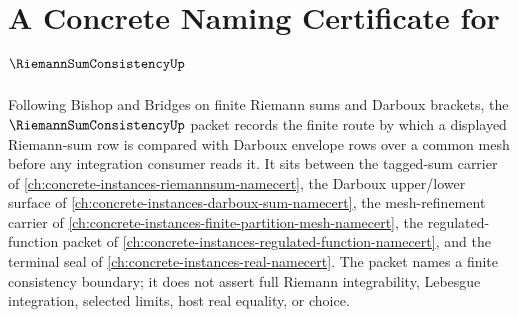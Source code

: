 \chapter{A Concrete Naming Certificate for $\RiemannSumConsistencyUp$}
\label{ch:concrete-instances-riemann-sum-consistency-namecert}

Following Bishop and Bridges on finite Riemann sums and Darboux brackets, the $\RiemannSumConsistencyUp$ packet records the finite route by which a displayed Riemann-sum row is compared with Darboux envelope rows over a common mesh before any integration consumer reads it. It sits between the tagged-sum carrier of \autoref{ch:concrete-instances-riemannsum-namecert}, the Darboux upper/lower surface of \autoref{ch:concrete-instances-darboux-sum-namecert}, the mesh-refinement carrier of \autoref{ch:concrete-instances-finite-partition-mesh-namecert}, the regulated-function packet of \autoref{ch:concrete-instances-regulated-function-namecert}, and the terminal seal of \autoref{ch:concrete-instances-real-namecert}. The packet names a finite consistency boundary; it does not assert full Riemann integrability, Lebesgue integration, selected limits, host real equality, or choice.

